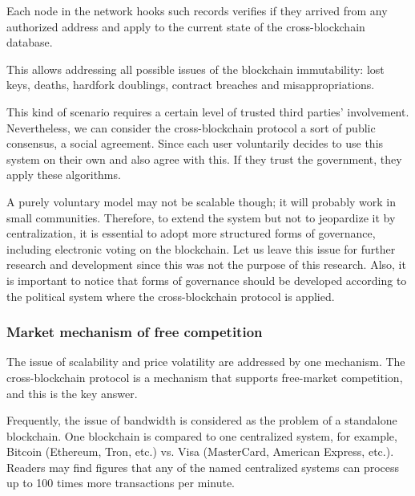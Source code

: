 \begin{multicols}{2}
Each node in the network hooks such records verifies if they arrived from any authorized address and apply to the current state of the cross-blockchain database.

This allows addressing all possible issues of the blockchain immutability: lost keys, deaths, hardfork doublings, contract breaches and misappropriations.

This kind of scenario requires a certain level of trusted third parties’ involvement. Nevertheless, we can consider the cross-blockchain protocol a sort of public consensus, a social agreement. Since each user voluntarily decides to use this system on their own and also agree with this. If they trust the government, they apply these algorithms.

A purely voluntary model may not be scalable though; it will probably work in small communities. Therefore, to extend the system but not to jeopardize it by centralization, it is essential to adopt more structured forms of governance, including electronic voting on the blockchain. Let us leave this issue for further research and development since this was not the purpose of this research. Also, it is important to notice that forms of governance should be developed according to the political system where the cross-blockchain protocol is applied.

\setcounter{secnumdepth}{5}
\renewcommand\thesubsubsection{\arabic{section}.\arabic{subsection}.\alph{subsubsection}}

\vspace{-.4cm}

\subsubsection{Market mechanism of free competition}\label{subsubsec-5.2.c}

\vspace{-.3cm}

The issue of scalability and price volatility are addressed by one mechanism. The cross-blockchain protocol is a mechanism that supports free-market competition, and this is the key answer.

Frequently, the issue of bandwidth is considered as the problem of a standalone blockchain. One blockchain is compared to one centralized system, for example, Bitcoin (Ethereum, Tron, etc.) vs. Visa (MasterCard, American Express, etc.). Readers may find figures that any of the named centralized systems can process up to 100 times more transactions per minute.


\end{multicols}
